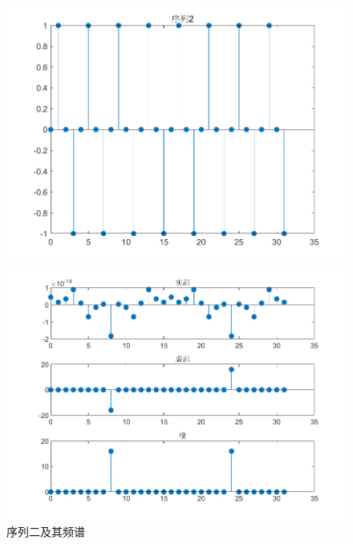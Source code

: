 \documentclass{../source/zjureport}
\begin{document}
            \begin{figure}[H]
                \centering
                \begin{minipage}[t]{0.48\textwidth}
                \centering
                \includegraphics[width=\textwidth]{figure/序列2.png}
                \end{minipage}
                \begin{minipage}[t]{0.48\textwidth}
                \centering
                \includegraphics[width=\textwidth]{figure/频谱_序列2.png}
                \end{minipage}
                \caption{序列二及其频谱}
            \end{figure}
\end{document}
